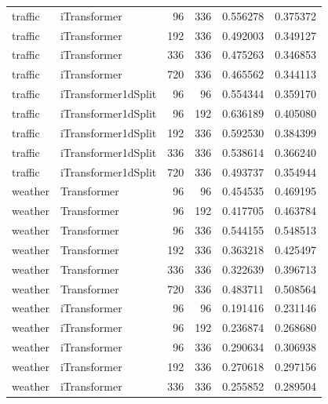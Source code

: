 \documentclass[stu,12pt,floatsintext]{apa7}
\begin{document}
\begin{longtable}{llrrrr}
     traffic &        iTransformer &            96 &            336 & 0.556278 & 0.375372 \\
     traffic &        iTransformer &           192 &            336 & 0.492003 & 0.349127 \\
     traffic &        iTransformer &           336 &            336 & 0.475263 & 0.346853 \\
     traffic &        iTransformer &           720 &            336 & 0.465562 & 0.344113 \\
     traffic & iTransformer1dSplit &            96 &             96 & 0.554344 & 0.359170 \\
     traffic & iTransformer1dSplit &            96 &            192 & 0.636189 & 0.405080 \\
     traffic & iTransformer1dSplit &           192 &            336 & 0.592530 & 0.384399 \\
     traffic & iTransformer1dSplit &           336 &            336 & 0.538614 & 0.366240 \\
     traffic & iTransformer1dSplit &           720 &            336 & 0.493737 & 0.354944 \\
     weather &         Transformer &            96 &             96 & 0.454535 & 0.469195 \\
     weather &         Transformer &            96 &            192 & 0.417705 & 0.463784 \\
     weather &         Transformer &            96 &            336 & 0.544155 & 0.548513 \\
     weather &         Transformer &           192 &            336 & 0.363218 & 0.425497 \\
     weather &         Transformer &           336 &            336 & 0.322639 & 0.396713 \\
     weather &         Transformer &           720 &            336 & 0.483711 & 0.508564 \\
     weather &        iTransformer &            96 &             96 & 0.191416 & 0.231146 \\
     weather &        iTransformer &            96 &            192 & 0.236874 & 0.268680 \\
     weather &        iTransformer &            96 &            336 & 0.290634 & 0.306938 \\
     weather &        iTransformer &           192 &            336 & 0.270618 & 0.297156 \\
     weather &        iTransformer &           336 &            336 & 0.255852 & 0.289504 \\

\end{longtable}
\end{document}
